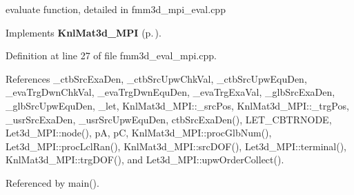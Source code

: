 evaluate function, detailed in fmm3d\_\-mpi\_\-eval.cpp 

Implements {\bf Knl\-Mat3d\_\-MPI} {\rm (p.\,\pageref{classKnlMat3d__MPI_abf7f0a466fbc47db0804a35093c819f_abf7f0a466fbc47db0804a35093c819f})}.

Definition at line 27 of file fmm3d\_\-eval\_\-mpi.cpp.

References \_\-ctb\-Src\-Exa\-Den, \_\-ctb\-Src\-Upw\-Chk\-Val, \_\-ctb\-Src\-Upw\-Equ\-Den, \_\-eva\-Trg\-Dwn\-Chk\-Val, \_\-eva\-Trg\-Dwn\-Equ\-Den, \_\-eva\-Trg\-Exa\-Val, \_\-glb\-Src\-Exa\-Den, \_\-glb\-Src\-Upw\-Equ\-Den, \_\-let, Knl\-Mat3d\_\-MPI::\_\-src\-Pos, Knl\-Mat3d\_\-MPI::\_\-trg\-Pos, \_\-usr\-Src\-Exa\-Den, \_\-usr\-Src\-Upw\-Equ\-Den, ctb\-Src\-Exa\-Den(), LET\_\-CBTRNODE, Let3d\_\-MPI::node(), p\-A, p\-C, Knl\-Mat3d\_\-MPI::proc\-Glb\-Num(), Let3d\_\-MPI::proc\-Lcl\-Ran(), Knl\-Mat3d\_\-MPI::src\-DOF(), Let3d\_\-MPI::terminal(), Knl\-Mat3d\_\-MPI::trg\-DOF(), and Let3d\_\-MPI::upw\-Order\-Collect().

Referenced by main().

